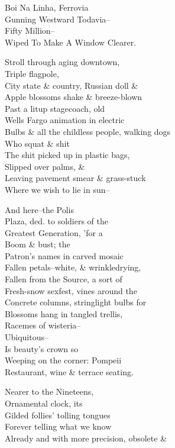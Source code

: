 \qquad Boi Na Linha, Ferrovia \\
\qquad Gunning Westward Todavia-- \\
\qquad Fifty Million-- \\
\qquad Wiped To Make A Window Clearer.

Stroll through aging downtown, \\
Triple flagpole, \\
City state \& country, Russian doll \& \\
Apple blossoms shake \& breeze-blown \\
Past a litup stagecoach, old \\
Wells Fargo animation in electric \\
Bulbs \& all the childless people, walking dogs \\
Who squat \& shit \\
The shit picked up in plastic bags, \\
Slipped over palms, \& \\
Leaving pavement smear \& grass-stuck \\
Where we wish to lie in sun--

And here--the Polis \\
Plaza, ded. to soldiers of the \\
Greatest Generation, 'for a \\
Boom \& bust; the \\
Patron's names in carved mosaic \\
Fallen petals--white, \& wrinkledrying, \\
Fallen from the Source, a sort of \\
Fresh-snow sexfest, vines around the \\
Concrete columns, stringlight bulbs for \\
Blossoms hang in tangled trellis, \\
Racemes of wisteria-- \\
Ubiquitous-- \\
Is beauty's crown so \\
Weeping on the corner: Pompeii \\
Restaurant, wine \& terrace seating.

Nearer to the Nineteens, \\
Ornamental clock, its \\
Gilded follies' tolling tongues \\
Forever telling what we know \\
Already and with more precision, obsolete \&

